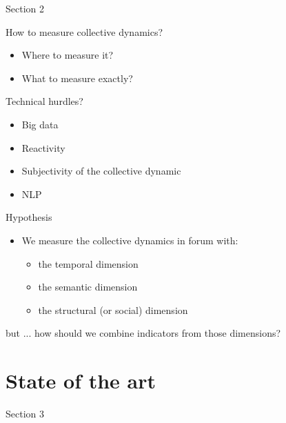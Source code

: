 \documentclass{beamer}
\begin{document}
\begin{frame}{Section 2}
  \tableofcontents[sectionstyle=show/shaded,
  subsectionstyle=show/show/hide]
\end{frame}

\begin{frame}{How to measure collective dynamics?}
  \begin{itemize}
  \item Where to measure it?
  \item What to measure exactly?
  \end{itemize}
  
  \begin{block}{Technical hurdles?}
    \begin{itemize}
    \item Big data
    \item Reactivity
    \item Subjectivity of the collective dynamic
    \item NLP
    \end{itemize}
  \end{block}
\end{frame}

\begin{frame}{Hypothesis}
  \begin{itemize}
  \item We measure the collective dynamics in forum with:
    \begin{itemize}
    \item the temporal dimension
    \item the semantic dimension
    \item the structural (or social) dimension
    \end{itemize}
  \end{itemize}

  \begin{block}{but ... how should we combine indicators from those dimensions?}
  \end{block}
  
\end{frame}

\section{State of the art}

\begin{frame}{Section 3}
  \tableofcontents[sectionstyle=show/shaded,
  subsectionstyle=show/show/hide]
\end{frame}
\end{document}
